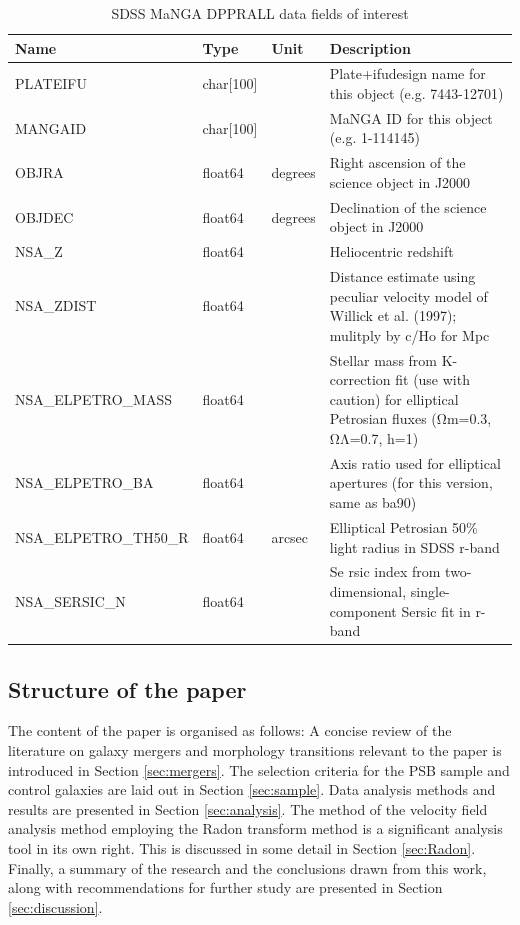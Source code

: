 \begin{table}
\caption[MaNGA DRPALL fields]{SDSS MaNGA DPPRALL data fields of interest}
\label{tab:DRPall-table}
\begin{tabular}{|p{3.2cm}|p{1.2cm}||p{1cm}|p{10cm}|}
\hline
Name & Type & Unit & Description \\
\hline
PLATEIFU & char{[}100{]} &  & Plate+ifudesign name for this object (e.g. 7443-12701)\\
MANGAID & char{[}100{]} & & MaNGA ID for this object (e.g. 1-114145)\\
OBJRA & float64 & degrees & Right ascension of the science object in J2000\\
OBJDEC & float64 & degrees & Declination of the science object in J2000\\
NSA\_Z & float64 &  & Heliocentric redshift\\
NSA\_ZDIST & float64 &  & Distance estimate using peculiar velocity model of Willick et al. (1997); mulitply by c/Ho for Mpc\\
NSA\_ELPETRO\_MASS & float64 &  & Stellar mass from K-correction fit (use with caution) for elliptical Petrosian fluxes (Ωm=0.3, ΩΛ=0.7, h=1)\\
NSA\_ELPETRO\_BA & float64 &  & Axis ratio used for elliptical apertures (for this version, same as ba90)\\
NSA\_ELPETRO\_TH50\_R & float64 & arcsec & Elliptical Petrosian 50\% light radius in SDSS r-band\\
NSA\_SERSIC\_N & float64 &  & Se
rsic index from two-dimensional, single-component Sersic fit in r-band\\
\hline
\end{tabular}
\end{table}

\subsection{Structure of the paper}
The content of the paper is organised as follows: A concise review of the literature on galaxy mergers and morphology transitions relevant to the paper is introduced in Section \ref{sec:mergers}. The selection criteria for the PSB sample and control galaxies are laid out in Section \ref{sec:sample}. Data analysis methods and results are presented in Section \ref{sec:analysis}. The method of the velocity field analysis method employing the Radon transform method is a significant analysis tool in its own right. This is discussed in some detail in Section \ref{sec:Radon}. Finally, a summary of the research and the conclusions drawn from this work, along with recommendations for further study are presented in Section \ref{sec:discussion}.
